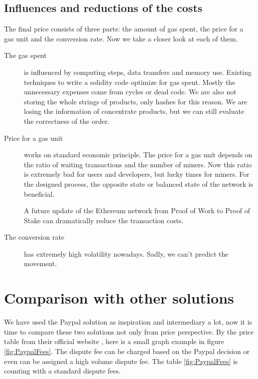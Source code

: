 \documentclass[thesis=M,english]{FITthesis}[2019/12/23]
\begin{document}
\subsection{Influences and reductions of the costs}

The final price consists of three parts: the amount of gas spent, the price for a gas unit and the conversion rate. Now we take a closer look at each of them.

\begin{description}

\item[The gas spent] is influenced by computing steps, data transfers and memory use. Existing techniques to write a solidity code optimize for gas spent. Mostly the unnecessary expenses come from cycles or dead code. We are also not storing the whole strings of products, only hashes for this reason. We are losing the information of concentrate products, but we can still evaluate the correctness of the order. 


\item[Price for a gas unit] works on standard economic principle. The price for a gas unit depends on the ratio of waiting transactions and the number of miners. Now this ratio is extremely bad for users and developers, but lucky times for miners.  For the designed process, the opposite state or balanced state of the network is beneficial. \cite{gasHigh}

A future update of the Ethereum network from Proof of Work to Proof of Stake can dramatically reduce the transaction costs.

\item[The conversion rate] has extremely high volatility nowadays. Sadly, we can't predict the movement.

\end{description}



\section{Comparison with other solutions}

We have used the Paypal solution as inspiration and intermediary a lot, now it is time to compare these two solutions not only from price perspective. By the price table from their official website \cite{paypalfees}, here is a small graph example in figure \ref{fig:PaypalFees}. The dispute fee can be charged based on the Paypal decision or even can be assigned a high volume dispute fee. The table \ref{fig:PaypalFees} is counting with a standard dispute fees. 
\end{document}
